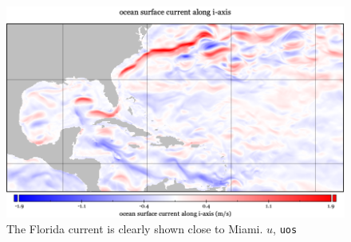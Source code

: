 \begin{figure}
\includegraphics[width=\linewidth]{images/example-images/uos.png}
\caption{The Florida current is clearly shown
         close to Miami. $u$, \texttt{uos} }
\label{fig:uos}
\end{figure}
